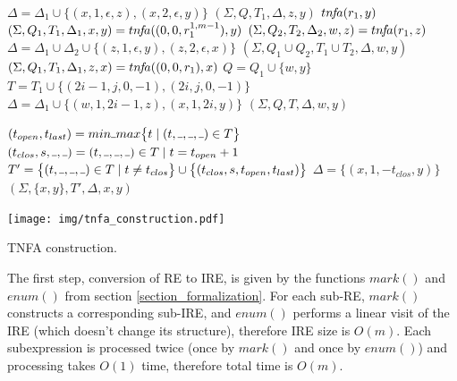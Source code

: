 \documentclass[AMA,STIX1COL]{WileyNJD-v2}
\let\oldnl\nl
\newcommand{\nonl}{\renewcommand{\nl}{\let\nl\oldnl}} %
\newcommand{\Xund}{\rule{.4em}{.4pt}}
\begin{document}
\begin{algorithm}[]
\begin{multicols}{2}
{{            $\Delta = \Delta_1 \cup \big\{ (x, 1, \epsilon, z), (x, 2, \epsilon, y) \big\}$ \;
            \Return $(\Sigma, Q, T_1, \Delta, z, y)$
        }
        \BlankLine
         {
            \Return $tn\!f\!a (r_1, y)$
        }
        \BlankLine
         {
            $(\Sigma, Q_1, T_1, \Delta_1, x, y) = tn\!f\!a ((0, 0, r_1^{1,m-1}), y)$ \;
            $(\Sigma, Q_2, T_2, \Delta_2, w, z) = tn\!f\!a (r_1, z)$ \;
            $\Delta = \Delta_1 \cup \Delta_2 \cup \big\{ (z, 1, \epsilon, y), (z, 2, \epsilon, x) \big\}$ \;
            \Return $(\Sigma, Q_1 \cup Q_2, T_1 \cup T_2, \Delta, w, y)$
        }
        \BlankLine
         {
            $(\Sigma, Q_1, T_1, \Delta_1, z, x) = tn\!f\!a ((0, 0, r_1), x)$ \;
            $Q = Q_1 \cup \{w, y\}$ \;
            $T = T_1 \cup \big\{ (2i\!-\!1, j, 0, -1), (2i, j, 0, -1) \big\}$ \;
            $\Delta = \Delta_1 \cup \big\{ (w, 1, 2i\!-\!1, z), (x, 1, 2i, y) \big\}$ \;
            \Return $(\Sigma, Q, T, \Delta, w, y)$
        }
    }
    \BlankLine
    \BlankLine

     {
        $(t_{open}, t_{last}) = min \Xund max \big\{ t \mid (t, \Xund, \Xund, \Xund) \in T \big\}$ \;
        $(t_{clos}, s, \Xund, \Xund) = (t, \Xund, \Xund, \Xund) \in T \mid t = t_{open} + 1$ \;
        $T' = \big\{ (t, \Xund, \Xund, \Xund) \in T \mid t \neq t_{clos} \big\} \cup \big\{ (t_{clos}, s, t_{open}, t_{last}) \big\}$ \;
        $\Delta = \big\{ (x, 1, -t_{clos}, y) \big\}$ \;
        \Return $(\Sigma, \{x, y\}, T', \Delta, x, y)$ \;
    }

    \vfill

\columnbreak

    \nonl \texttt{[image: img/tnfa\_construction.pdf]}

\end{multicols}
\vspace{0.5em}
\caption{TNFA construction.}\label{alg_tnfa}
\end{algorithm}

The first step, conversion of RE to IRE, is given by the functions $mark()$ and $enum()$ from section \ref{section_formalization}.
%
For each sub-RE, $mark()$ constructs a corresponding sub-IRE,
and $enum()$ performs a linear visit of the IRE (which doesn't change its structure),
therefore IRE size is $O(m)$.
%
Each subexpression is processed twice (once by $mark()$ and once by $enum()$)
and processing takes $O(1)$ time, therefore total time is $O(m)$.
\\
\end{document}
